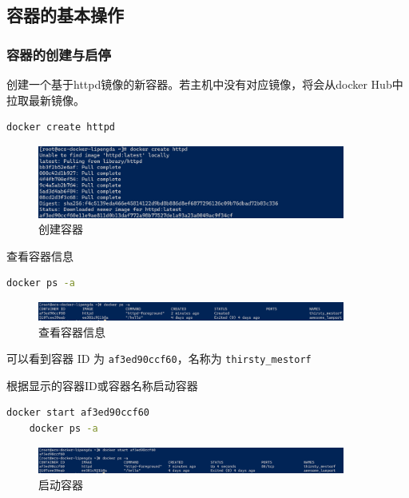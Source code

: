 \documentclass{article}
\begin{document}
\subsection{容器的基本操作}
\label{subsec:container-management}

\subsubsection{容器的创建与启停}

创建一个基于httpd镜像的新容器。若主机中没有对应镜像，将会从docker Hub中拉取最新镜像。

\begin{lstlisting}[language=bash]
    docker create httpd
\end{lstlisting}

\begin{figure}[H]
\centering
\includegraphics[width=0.9\textwidth]{img/0.2.4.1.1.png}
\caption{创建容器}
\end{figure}

查看容器信息

\begin{lstlisting}[language=bash]
    docker ps -a
\end{lstlisting}

\begin{figure}[H]
\centering
\includegraphics[width=0.9\textwidth]{img/0.2.4.1.2.png}
\caption{查看容器信息}
\end{figure}

可以看到容器 ID 为 \texttt{af3ed90ccf60}，名称为 \texttt{thirsty\_mestorf}

根据显示的容器ID或容器名称启动容器

\begin{lstlisting}[language=bash]
    docker start af3ed90ccf60
    docker ps -a
\end{lstlisting}

\begin{figure}[H]
\centering
\includegraphics[width=0.9\textwidth]{img/0.2.4.1.3.png}
\caption{启动容器}
\end{figure}
\end{document}
